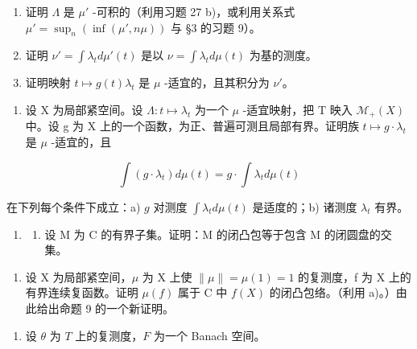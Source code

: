 \begin{enumerate}
\def\labelenumi{\alph{enumi})}
\item
  证明 \(\Lambda\) 是 \(\mu'\) -可积的（利用习题 27 b)，或利用关系式 \(\mu' = \sup_n \left( \inf(\mu', n\mu) \right)\) 与 §3 的习题 9）。
\item
  证明 \(\nu' = \int \lambda_t d\mu'(t)\) 是以 \(\nu = \int \lambda_t d\mu(t)\) 为基的测度。
\item
  证明映射 \(t \mapsto g(t)\lambda_t\) 是 \(\mu\) -适宜的，且其积分为 \(\nu'\)。
\end{enumerate}

\begin{enumerate}
\def\labelenumi{\arabic{enumi})}
\setcounter{enumi}{28}
\tightlist
\item
  设 X 为局部紧空间。设 \(\Lambda: t \mapsto \lambda_{t}\) 为一个 \(\mu\) -适宜映射，把 T 映入 \(\mathcal{M}_{+}(X)\) 中。设 g 为 X 上的一个函数，为正、普遍可测且局部有界。证明族 \(t \mapsto g \cdot \lambda_{t}\) 是 \(\mu\) -适宜的，且
\end{enumerate}

\[
\int (g \cdot \lambda_ {t}) d \mu (t) = g \cdot \int \lambda_ {t} d \mu (t)
\]

在下列每个条件下成立：a) \(g\) 对测度 \(\int \lambda_t d\mu(t)\) 是适度的；b) 诸测度 \(\lambda_t\) 有界。

\begin{enumerate}
\def\labelenumi{\arabic{enumi})}
\setcounter{enumi}{29}
\tightlist
\item
  \begin{enumerate}
  \def\labelenumii{\alph{enumii})}
  \tightlist
  \item
    设 M 为 C 的有界子集。证明：M 的闭凸包等于包含 M 的闭圆盘的交集。
  \end{enumerate}
\end{enumerate}

\begin{enumerate}
\def\labelenumi{\alph{enumi})}
\setcounter{enumi}{1}
\tightlist
\item
  设 X 为局部紧空间，\(\mu\) 为 X 上使 \(\|\mu\| = \mu(1) = 1\) 的复测度，f 为 X 上的有界连续复函数。证明 \(\mu(f)\) 属于 C 中 \(f(X)\) 的闭凸包络。（利用 a)。）由此给出命题 9 的一个新证明。
\end{enumerate}

\begin{enumerate}
\def\labelenumi{\arabic{enumi})}
\setcounter{enumi}{30}
\tightlist
\item
  设 \(\theta\) 为 \(T\) 上的复测度，\(F\) 为一个 Banach 空间。
\end{enumerate}

